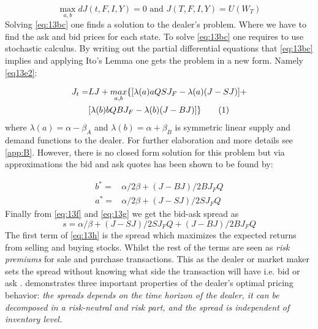 \documentclass{kththesis}
\theoremstyle{definition}
\newcommand\numberthis{\addtocounter{equation}{1}\tag{\theequation}}
\begin{document}
\begin{equation}
    \label{eq:13bc}
    \underset{a,b}{\max}dJ(t,F,I,Y)=0 \text{ and } 
    J(T,F,I,Y)=U(W_T)
\end{equation}
Solving \autoref{eq:13bc} one finds a solution to the dealer's problem. Where we have to find the ask and bid prices for each state. To solve \autoref{eq:13bc} one requires to use stochastic calculus. By writing out the partial differential equations that \autoref{eq:13bc} implies and applying Ito's Lemma one gets the problem in a new form. Namely \autoref{eq13e2}:

\begin{align*}
    \label{eq13e2}
    J_{t} = & LJ + \underset{a,b}{max}\{[\lambda(a)aQSJ_{F} - \lambda(a)(J-SJ)] + \\
    & [\lambda(b)bQBJ_{F} - \lambda(b)(J-BJ)]\} 
    \numberthis
\end{align*}
where $\lambda(a) = \alpha - \beta_{A}$ and $\lambda(b) = \alpha + \beta_{B} $ is symmetric linear supply and demand functions to the dealer. For further elaboration and more details see \autoref{app:B}. However, there is no closed form solution for this problem but via approximations the bid and ask quotes has been shown to be found by:

\begin{align}
\label{eq:13f}
    b^{*} = & \alpha/2\beta + (J-BJ)/2BJ_{F}Q \\
    a^{*} = & \alpha/2\beta + (J-SJ)/2SJ_{F}Q \label{eq:13g}
\end{align}
Finally from \autoref{eq:13f} and \autoref{eq:13g} we get the bid-ask spread as
\begin{equation}
    \label{eq:13h}
    s = \alpha / \beta + (J-SJ)/2SJ_{F}Q + (J-BJ)/2BJ_{F}Q
\end{equation}
The first term of \autoref{eq:13h} is the spread which maximizes the expected returns from selling and buying stocks. Whilst the rest of the terms are seen as \textit{risk premiums} for sale and purchase transactions. This as the dealer or market maker sets the spread without knowing what side the transaction will have i.e. bid or ask \parencite{ho1981optimal}.
\newline
\newline
\textcite{ho1981optimal} demonstrates three important properties of the dealer's optimal pricing behavior: \textit{the spreads depends on the time horizon of the dealer, it can be decomposed in a risk-neutral and risk part, and the spread is independent of inventory level.}
\end{document}
